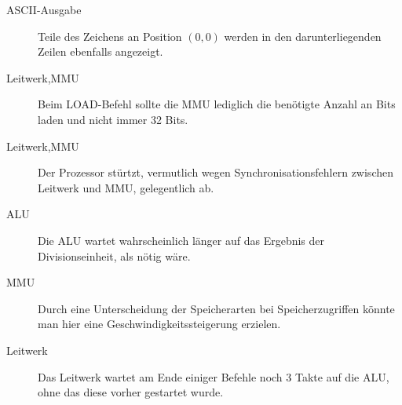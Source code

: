 \begin{description}
\item[ASCII-Ausgabe] Teile des Zeichens an Position \((0,0)\) werden in den
darunterliegenden Zeilen ebenfalls angezeigt.
\item[Leitwerk,MMU] Beim LOAD-Befehl sollte die MMU lediglich die ben\"otigte
Anzahl an Bits laden und nicht immer 32 Bits.
\item[Leitwerk,MMU] Der Prozessor st\"urtzt, vermutlich wegen
Synchronisationsfehlern zwischen Leitwerk und MMU, gelegentlich ab.
\item[ALU] Die ALU wartet wahrscheinlich l\"anger auf das Ergebnis der
Divisionseinheit, als n\"otig w\"are.
\item[MMU] Durch eine Unterscheidung der Speicherarten bei Speicherzugriffen
k\"onnte man hier eine Geschwindigkeitssteigerung erzielen.
\item[Leitwerk] Das Leitwerk wartet am Ende einiger Befehle noch 3 Takte auf
die ALU, ohne das diese vorher gestartet wurde.
\end{description}
